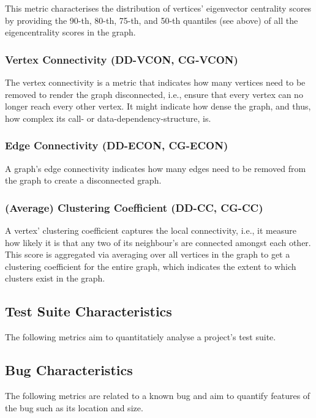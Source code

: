 \documentclass{scrartcl}
\begin{document}
This metric characterises the distribution of vertices' eigenvector centrality
scores by providing the 90-th, 80-th, 75-th, and 50-th quantiles (see above) of
all the eigencentrality scores in the graph.

\subsubsection{Vertex Connectivity (DD-VCON, CG-VCON)}

The vertex connectivity is a metric that indicates how many vertices need to be
removed to render the graph disconnected, i.e., ensure that every vertex can no
longer reach every other vertex. It might indicate how dense the graph, and
thus, how complex its call- or data-dependency-structure, is.

\subsubsection{Edge Connectivity (DD-ECON, CG-ECON)}

A graph's edge connectivity indicates how many edges need to be removed from the
graph to create a disconnected graph.

\subsubsection{(Average) Clustering Coefficient (DD-CC, CG-CC)}

A vertex' clustering coefficient captures the local connectivity, i.e., it
measure how likely it is that any two of its neighbour's are connected amongst
each other. This score is aggregated via averaging over all vertices in the
graph to get a clustering coefficient for the entire graph, which indicates the
extent to which clusters exist in the graph.

\subsection{Test Suite Characteristics}

The following metrics aim to quantitatiely analyse a project's test suite.

\subsection{Bug Characteristics}

The following metrics are related to a known bug and aim to quantify features of
the bug such as its location and size.
\end{document}
